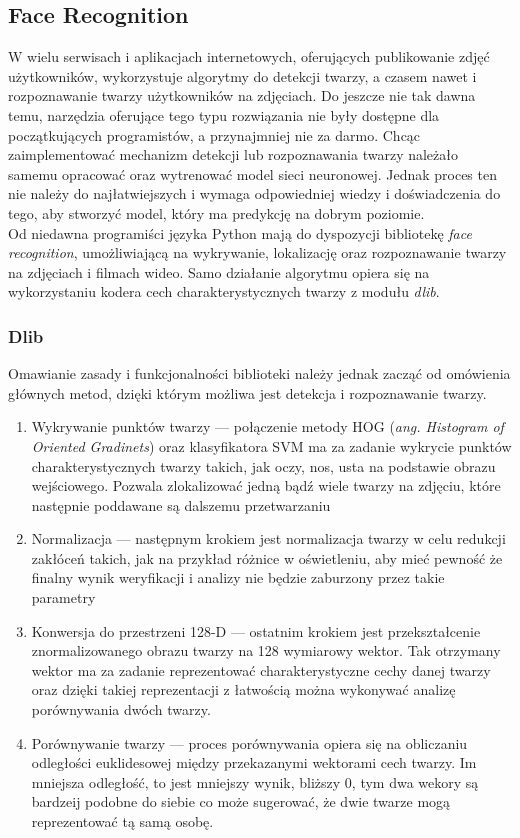 \subsection{Face Recognition}
W wielu serwisach i aplikacjach internetowych, oferujących publikowanie zdjęć użytkowników, wykorzystuje algorytmy do detekcji twarzy, a czasem nawet i rozpoznawanie twarzy użytkowników na zdjęciach. Do jeszcze nie tak dawna temu, narzędzia oferujące tego typu rozwiązania nie były dostępne dla początkujących programistów, a przynajmniej nie za darmo. Chcąc zaimplementować mechanizm detekcji lub rozpoznawania twarzy należało samemu opracować oraz wytrenować model sieci neuronowej. Jednak proces ten nie należy do najłatwiejszych i wymaga odpowiedniej wiedzy i doświadczenia do tego, aby stworzyć model, który ma predykcję na dobrym poziomie. \\
Od niedawna programiści języka Python mają do dyspozycji bibliotekę \emph{face recognition}, umożliwiającą na wykrywanie, lokalizację oraz rozpoznawanie twarzy na zdjęciach i filmach wideo. Samo działanie algorytmu opiera się na wykorzystaniu kodera cech charakterystycznych twarzy z modułu \emph{dlib}.

\subsubsection{Dlib}
Omawianie zasady i funkcjonalności biblioteki należy jednak zacząć od omówienia głównych metod, dzięki którym możliwa jest detekcja i rozpoznawanie twarzy. \\
\begin{enumerate}
  \item Wykrywanie punktów twarzy --- połączenie metody HOG (\emph{ang. Histogram of Oriented Gradinets}) oraz klasyfikatora SVM ma za zadanie wykrycie punktów charakterystycznych twarzy takich, jak oczy, nos, usta na podstawie obrazu wejściowego. Pozwala zlokalizować jedną bądź wiele twarzy na zdjęciu, które następnie poddawane są dalszemu przetwarzaniu
  \item Normalizacja --- następnym krokiem jest normalizacja twarzy w celu redukcji zakłóceń takich, jak na przykład różnice w oświetleniu, aby mieć pewność że finalny wynik weryfikacji i analizy nie będzie zaburzony przez takie parametry
  \item Konwersja do przestrzeni 128-D --- ostatnim krokiem jest przekształcenie znormalizowanego obrazu twarzy na 128 wymiarowy wektor. Tak otrzymany wektor ma za zadanie reprezentować charakterystyczne cechy danej twarzy oraz dzięki takiej reprezentacji z łatwością można wykonywać analizę porównywania dwóch twarzy.
  \item Porównywanie twarzy --- proces porównywania opiera się na obliczaniu odległości euklidesowej między przekazanymi wektorami cech twarzy. Im mniejsza odległość, to jest mniejszy wynik, bliższy 0, tym dwa wekory są bardzeij podobne do siebie co może sugerować, że dwie twarze mogą reprezentować tą samą osobę.
\end{enumerate}


